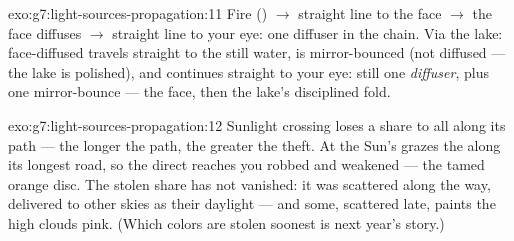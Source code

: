 \begin{solution}{exo:g7:light-sources-propagation:11}
Fire () $\to$ straight line to the face $\to$ the
face diffuses $\to$ straight line to your eye: one diffuser in
the chain. Via the lake: face-diffused  travels straight to
the still water, is mirror-bounced (not diffused --- the lake is
polished), and continues straight to your eye: still one
\emph{diffuser}, plus one mirror-bounce --- the face, then the
lake's disciplined fold.
\end{solution}

\begin{solution}{exo:g7:light-sources-propagation:12}
Sunlight crossing  loses a share to  all along its
path --- the longer the path, the greater the theft. At 
the Sun's  grazes the  along its longest road, so
the direct  reaches you robbed and weakened --- the tamed
orange disc. The stolen share has not vanished: it was
scattered along the way, delivered to other skies as their
daylight --- and some, scattered late, paints the high clouds
pink. (Which colors are stolen soonest is next year's story.)
\end{solution}


